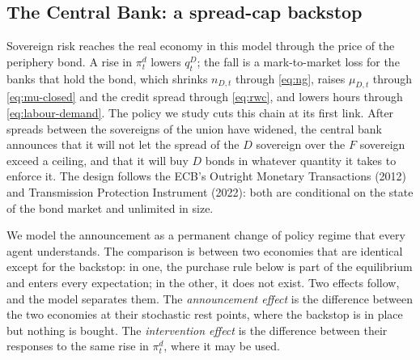 \subsection{The Central Bank: a spread-cap backstop}
\label{sec:cb}

Sovereign risk reaches the real economy in this model through the price of the
periphery bond. A rise in $\pi^{d}_t$ lowers $q^{D}_t$; the fall is a
mark-to-market loss for the banks that hold the bond, which shrinks $n_{D,t}$
through \eqref{eq:ng}, raises $\mu_{D,t}$ through \eqref{eq:mu-closed} and the
credit spread through \eqref{eq:rwc}, and lowers hours through
\eqref{eq:labour-demand}. The policy we study cuts this chain at its first link.
After spreads between the sovereigns of the union have widened, the central bank
announces that it will not let the spread of the $D$ sovereign over the $F$
sovereign exceed a ceiling, and that it will buy $D$ bonds in whatever quantity
it takes to enforce it. The design follows the ECB's Outright Monetary
Transactions (2012) and Transmission Protection Instrument (2022): both are
conditional on the state of the bond market and unlimited in size.

We model the announcement as a permanent change of policy regime that every
agent understands. The comparison is between two economies that are identical
except for the backstop: in one, the purchase rule below is part of the
equilibrium and enters every expectation; in the other, it does not exist. Two
effects follow, and the model separates them. The \emph{announcement effect} is
the difference between the two economies at their stochastic rest points, where
the backstop is in place but nothing is bought. The \emph{intervention effect} is
the difference between their responses to the same rise in $\pi^{d}_t$, where it
may be used.

